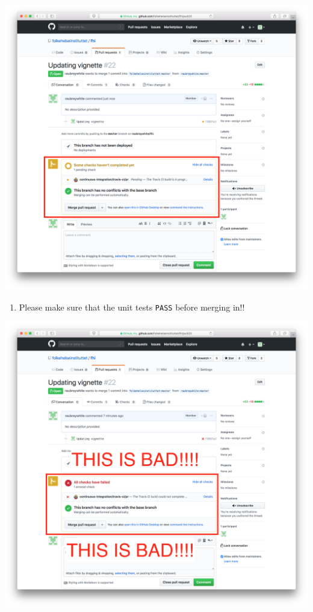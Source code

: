 \documentclass[12pt,]{article}
\providecommand{\tightlist}{%
  \setlength{\itemsep}{0pt}\setlength{\parskip}{0pt}}
\theoremstyle{definition}
\theoremstyle{definition}
\theoremstyle{definition}
\theoremstyle{remark}
\begin{document}
\includegraphics[width=38.11in]{images/pull_request_before_checks}

\begin{enumerate}
\def\labelenumi{\arabic{enumi}.}
\setcounter{enumi}{8}
\tightlist
\item
  Please make sure that the unit tests \texttt{PASS} before merging in!!
\end{enumerate}

\includegraphics[width=38.11in]{images/pull_request_checks_failed}
\end{document}
